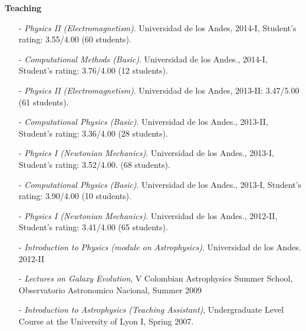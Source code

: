 \documentclass[9pt]{article}
\begin{document}
{\bf Teaching}
\begin{itemize}

\item[-] {\it Physics II (Electromagnetism)}. Universidad de
  los Andes, 2014-I, Student's rating: 3.55/4.00 (60 students).  
\item[-] {\it Computational Methods (Basic)}. Universidad de los
  Andes., 2014-I, Student's rating: 3.76/4.00 (12 students).
\item[-] {\it Physics II (Electromagnetism)}. Universidad de
  los Andes, 2013-II: 3.47/5.00 (61 students).
\item[-] {\it Computational Physics (Basic)}. Universidad de los
  Andes., 2013-II, Student's rating: 3.36/4.00 (28 students).
\item[-] {\it Physics I (Newtonian Mechanics)}. Universidad
  de los Andes., 2013-I, Student's rating: 3.52/4.00. (68 students).
\item[-] {\it Computational Physics (Basic)}. Universidad de los
  Andes., 2013-I, Student's rating: 3.90/4.00 (10 students).
\item[-] {\it Physics I (Newtonian Mechanics)}. Universidad
  de los Andes., 2012-II, Student's rating: 3.41/4.00 (65 students).
\item[-] {\it Introduction to Physics (module on
  Astrophysics)}. Universidad de los Andes.  2012-II
\item[-]{\it Lectures on Galaxy Evolution}, V Colombian
  Astrophysics Summer School, Observatorio Astronomico Nacional, Summer 2009
\item[-]{\it{Introduction to Astrophysics (Teaching
      Assistant)}}, Undergraduate Level Course at the University of Lyon I,
      Spring 2007.
\end{itemize}
\end{document}
